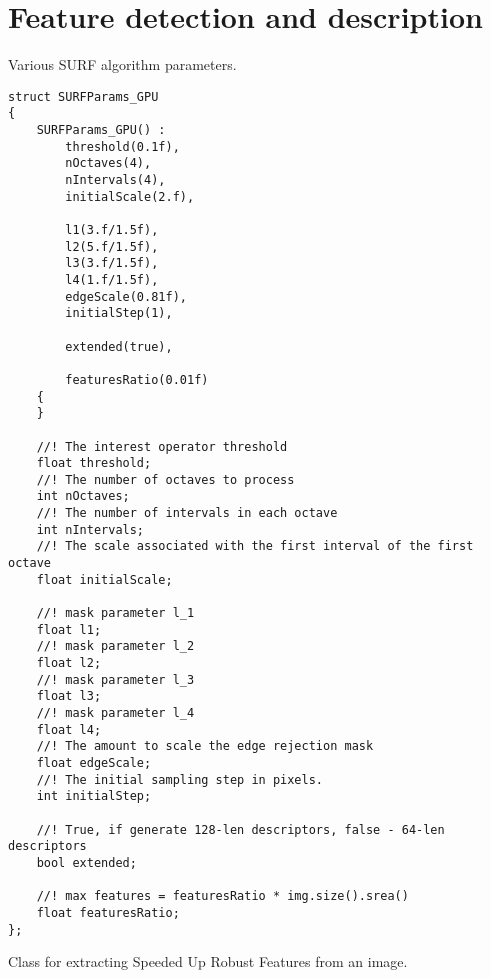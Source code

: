 \section{Feature detection and description}

Various SURF algorithm parameters. 

\begin{lstlisting}
struct SURFParams_GPU 
{
    SURFParams_GPU() :
        threshold(0.1f), 
        nOctaves(4),
        nIntervals(4),
        initialScale(2.f),

        l1(3.f/1.5f),
        l2(5.f/1.5f),
        l3(3.f/1.5f),
        l4(1.f/1.5f),
        edgeScale(0.81f),
        initialStep(1),

        extended(true),

        featuresRatio(0.01f)
    {
    }

    //! The interest operator threshold
    float threshold;
    //! The number of octaves to process
    int nOctaves;
    //! The number of intervals in each octave
    int nIntervals;
    //! The scale associated with the first interval of the first octave
    float initialScale;

    //! mask parameter l_1
    float l1;
    //! mask parameter l_2 
    float l2;
    //! mask parameter l_3
    float l3;
    //! mask parameter l_4
    float l4;
    //! The amount to scale the edge rejection mask
    float edgeScale;
    //! The initial sampling step in pixels.
    int initialStep;

    //! True, if generate 128-len descriptors, false - 64-len descriptors
    bool extended;

    //! max features = featuresRatio * img.size().srea()
    float featuresRatio;
};
\end{lstlisting}

Class for extracting Speeded Up Robust Features from an image.

